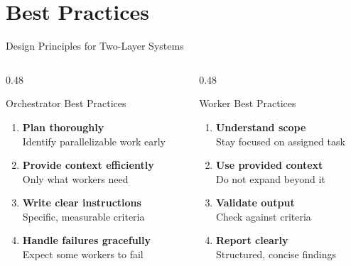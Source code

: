 \documentclass[aspectratio=169,11pt]{beamer}
\begin{document}
\section{Best Practices}

\begin{frame}{Design Principles for Two-Layer Systems}
\begin{columns}[T]
\begin{column}{0.48\textwidth}
\begin{block}{Orchestrator Best Practices}
\begin{enumerate}
    \item \textbf{Plan thoroughly}\\
          Identify parallelizable work early
    \item \textbf{Provide context efficiently}\\
          Only what workers need
    \item \textbf{Write clear instructions}\\
          Specific, measurable criteria
    \item \textbf{Handle failures gracefully}\\
          Expect some workers to fail
\end{enumerate}
\end{block}
\end{column}
\begin{column}{0.48\textwidth}
\begin{block}{Worker Best Practices}
\begin{enumerate}
    \item \textbf{Understand scope}\\
          Stay focused on assigned task
    \item \textbf{Use provided context}\\
          Do not expand beyond it
    \item \textbf{Validate output}\\
          Check against criteria
    \item \textbf{Report clearly}\\
          Structured, concise findings
\end{enumerate}
\end{block}
\end{column}
\end{columns}

\vspace{0.3cm}
\begin{center}
\end{center}
\end{frame}
\end{document}
